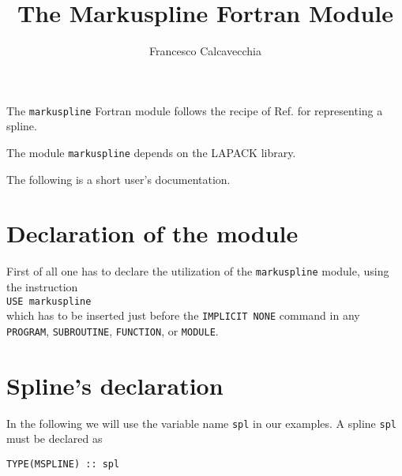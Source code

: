 \documentclass[11pt,a4paper,twoside]{article}
\title{The Markuspline Fortran Module}
\author{Francesco Calcavecchia}
\begin{document}
\maketitle

The \verb+markuspline+ Fortran module follows the recipe of Ref. \cite{Holzmann2005111} for representing a spline.

The module \verb+markuspline+ depends on the LAPACK library.

The following is a short user's documentation.

\section{Declaration of the module}
First of all one has to declare the utilization of the \verb+markuspline+ module, using the instruction\\\verb+USE markuspline+\\which has to be inserted just before the \verb+IMPLICIT NONE+ command in any \verb+PROGRAM+, \verb+SUBROUTINE+, \verb+FUNCTION+, or \verb+MODULE+.

\section{Spline's declaration}
In the following we will use the variable name \verb+spl+ in our examples.
A spline \verb+spl+ must be declared as
\begin{verbatim}
TYPE(MSPLINE) :: spl
\end{verbatim}
\end{document}
